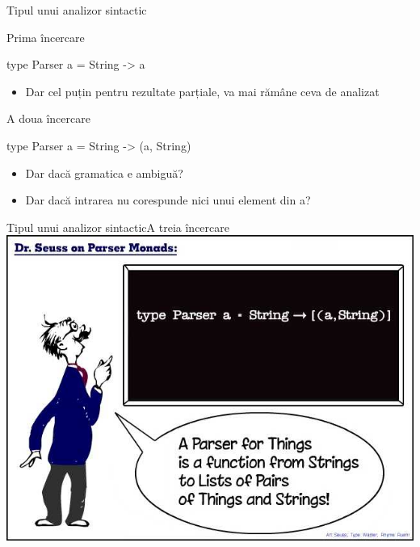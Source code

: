 \documentclass[xcolor=x11names,compress,10pt]{beamer}
\begin{document}
\begin{frame}[fragile]{Tipul unui analizor sintactic}
\begin{block}
{Prima încercare}
\begin{asciihs}
   type Parser a = String -> a
\end{asciihs}
\begin{itemize}
\item Dar cel puțin pentru rezultate parțiale, va mai rămâne ceva de analizat
\end{itemize}
\end{block}
%
\begin{block}
{A doua încercare}
\begin{asciihs}
   type Parser a = String -> (a, String)
\end{asciihs}
\begin{itemize}
\item Dar dacă gramatica e ambiguă?
\item Dar dacă intrarea nu corespunde nici unui element din a?
\end{itemize}
\end{block}
\end{frame}


%
%
%
\begin{frame}[fragile]{Tipul unui analizor sintactic}{A treia încercare}
\hfill \href{http://www.willamette.edu/~fruehr/haskell/seuss.html}{\includegraphics[scale=.4]{SeussFinal2}}\hfill\;
\end{frame}
\end{document}
